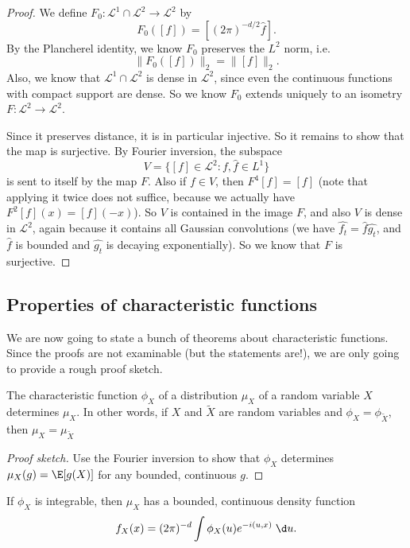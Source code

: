 \documentclass[a4paper]{article}
\begin{document}
\begin{proof}
  We define $F_0: \mathcal{L}^1 \cap \mathcal{L}^2 \to \mathcal{L}^2$ by
  \[
    F_0([f]) = [(2\pi)^{-d/2} \hat{f}].
  \]
  By the Plancherel identity, we know $F_0$ preserves the $L^2$ norm, i.e.
  \[
    \|F_0([f])\|_2 = \|[f]\|_2.
  \]
  Also, we know that $\mathcal{L}^1 \cap \mathcal{L}^2$ is dense in $\mathcal{L}^2$, since even the continuous functions with compact support are dense. So we know $F_0$ extends uniquely to an isometry $F: \mathcal{L}^2 \to \mathcal{L}^2$.

  Since it preserves distance, it is in particular injective. So it remains to show that the map is surjective. By Fourier inversion, the subspace
  \[
    V = \{[f] \in \mathcal{L}^2: f, \hat{f} \in L^1\}
  \]
  is sent to itself by the map $F$. Also if $f \in V$, then $F^4[f] = [f]$ (note that applying it twice does not suffice, because we actually have $F^2[f](x) = [f](-x)$). So $V$ is contained in the image $F$, and also $V$ is dense in $\mathcal{L}^2$, again because it contains all Gaussian convolutions (we have $\hat{f_t} = \hat{f} \hat{g_t}$, and $\hat{f}$ is bounded and $\hat{g_t}$ is decaying exponentially). So we know that $F$ is surjective.
\end{proof}

\subsection{Properties of characteristic functions}
We are now going to state a bunch of theorems about characteristic functions. Since the proofs are not examinable (but the statements are!), we are only going to provide a rough proof sketch.

\begin{thm}
  The characteristic function $\phi_X$ of a distribution $\mu_X$ of a random variable $X$ determines $\mu_X$. In other words, if $X$ and $\tilde{X}$ are random variables and $\phi_X = \phi_{\tilde{X}}$, then $\mu_X = \mu_{\tilde{X}}$
\end{thm}

\begin{proof}[Proof sketch]
  Use the Fourier inversion to show that $\phi_X$ determines $\mu_X(g) = \E[g(X)]$ for any bounded, continuous $g$.
\end{proof}

\begin{thm}
  If $\phi_X$ is integrable, then $\mu_X$ has a bounded, continuous density function
  \[
    f_X(x) = (2\pi)^{-d} \int \phi_X(u) e^{-i(u, x)}\;\d u.
  \]
\end{thm}
\end{document}
